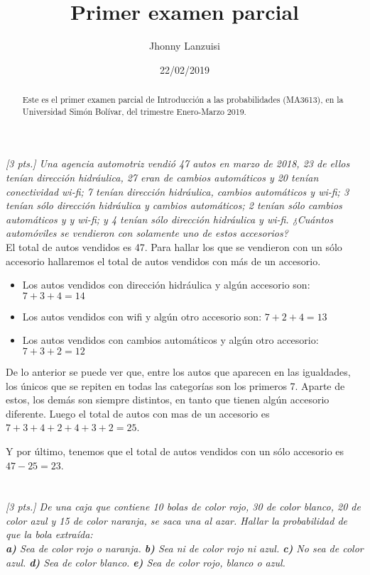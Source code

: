 \documentclass[11pt]{article}
\title{Primer examen parcial}
\author{Jhonny Lanzuisi}
\date{22/02/2019}
\renewcommand{\(}{\left(}
\renewcommand{\)}{\right)}
\begin{document}
\maketitle
\begin{abstract}
	Este es el primer examen parcial de Introducción a las probabilidades (MA3613), en la Universidad Simón Bolívar, del trimestre Enero-Marzo 2019.
\end{abstract}
\section{}
\textit{[3 pts.] Una agencia automotriz vendió 47 autos en marzo de 2018, 23 de ellos tenían dirección hidráulica, 27 eran de cambios automáticos y 20 tenían conectividad wi-fi; 7 tenían dirección hidráulica, cambios automáticos y wi-fi; 3 tenían sólo dirección hidráulica y cambios automáticos; 2 tenían sólo cambios automáticos y y wi-fi; y 4 tenían sólo dirección hidráulica y wi-fi. ¿Cuántos automóviles se vendieron con solamente uno de estos accesorios?} \\

El total de autos vendidos es 47. Para hallar los que se vendieron con un sólo accesorio hallaremos el total de autos vendidos con más de un accesorio. \\
\begin{itemize}
\item Los autos vendidos con dirección hidráulica y algún accesorio son: $7+3+4=14$ 
\item Los autos vendidos con wifi y algún otro accesorio son: $7+2+4=13$ 
\item Los autos vendidos con cambios automáticos y algún otro accesorio: $7+3+2=12$ 
\end{itemize} 
De lo anterior se puede ver que, entre los autos que aparecen en las igualdades, los únicos que se repiten en todas las categorías son los primeros 7. Aparte de estos, los demás son siempre distintos, en tanto que tienen algún accesorio diferente. Luego el total de autos con mas de un accesorio es $7+3+4+2+4+3+2=25$.

Y por último, tenemos que el total de autos vendidos con un sólo accesorio es $47-25=23$.

\section{}

\textit{[3 pts.] De una caja que contiene 10 bolas de color rojo, 30 de color blanco, 20 de color azul y 15 de color naranja, se saca una al azar. Hallar la probabilidad de que la bola extraída: \\
\textbf{a)} Sea de color rojo o naranja. \textbf{b)} Sea ni de color rojo ni azul. \textbf{c)} No sea de color azul. \textbf{d)} Sea de color blanco. \textbf{e)} Sea de color rojo, blanco o azul.} \\
\end{document}
